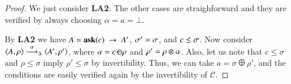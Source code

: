 \documentclass[main.tex]{subfiles}
\begin{document}
\begin{proof}%
	We just consider {\bf LA2}: The other cases are straighforward
	and they are verified by always choosing $\alpha = a = \bot$.
	
	By \textbf{LA2} we have $A = {\bf ask}(c) \ \rightarrow \ A'$, $\sigma' = \sigma$, and $c \leq \sigma$.
	Now consider $\langle A,\rho \rangle \stackrel{\alpha}{\longrightarrow}_\Delta \langle A',\rho' \rangle$, where 
	$\alpha = c \, {\ominus\hspace{-7.8pt} \div} \, \rho$ and $\rho' = \rho \otimes \alpha$.
	Also, let us note that $c \leq \sigma$ and $\rho \leq \sigma$ imply $\rho' \leq \sigma$
	by invertibility.
	Thus, we can take $a = \sigma \odiv \rho'$, and the conditions 
	are easily verified again by the invertibility of $\mathcal{C}$.
%	

\end{proof}
\end{document}
